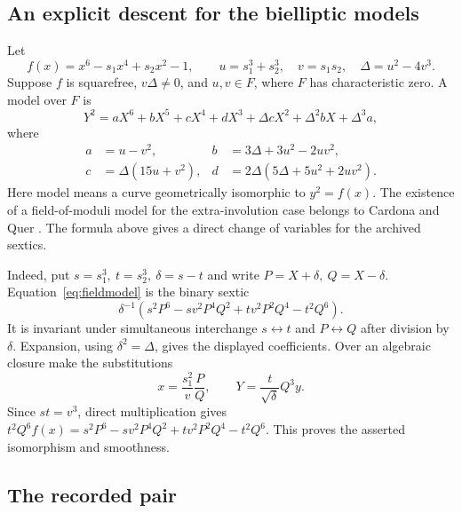 \documentclass[11pt,letterpaper]{amsart}
\theoremstyle{definition}
\numberwithin{equation}{section}
\begin{document}
\subsection{An explicit descent for the bielliptic models}

Let
\[
 f(x)=x^6-s_1x^4+s_2x^2-1,\qquad
 u=s_1^3+s_2^3,\quad v=s_1s_2,\quad \Delta=u^2-4v^3.
\]
Suppose \(f\) is squarefree, \(v\Delta\ne0\), and \(u,v\in F\), where
\(F\) has characteristic zero. A model over \(F\) is
\begin{equation}\label{eq:fieldmodel}
 Y^2=aX^6+bX^5+cX^4+dX^3+\Delta cX^2+\Delta^2 bX+\Delta^3a,
\end{equation}
where
\begin{align*}
 a&=u-v^2,& b&=3\Delta+3u^2-2uv^2,\\
 c&=\Delta(15u+v^2),& d&=2\Delta(5\Delta+5u^2+2uv^2).
\end{align*}
Here model means a curve geometrically isomorphic to \(y^2=f(x)\).
The existence of a field-of-moduli model for the extra-involution
case belongs to Cardona and Quer \cite{CardonaQuer}. The formula
above gives a direct change of variables for the archived sextics.

Indeed, put \(s=s_1^3,\ t=s_2^3,\ \delta=s-t\) and write
\(P=X+\delta,\ Q=X-\delta\). Equation~\eqref{eq:fieldmodel}
is the binary sextic
\[
 \delta^{-1}
 \left(s^2P^6-sv^2P^4Q^2+tv^2P^2Q^4-t^2Q^6\right).
\]
It is invariant under simultaneous interchange \(s\leftrightarrow t\)
and \(P\leftrightarrow Q\) after division by \(\delta\). Expansion,
using \(\delta^2=\Delta\), gives the displayed coefficients. Over
an algebraic closure make the substitutions
\[
 x=\frac{s_1^2}{v}\frac{P}{Q},\qquad
 Y=\frac{t}{\sqrt{\delta}}Q^3y.
\]
Since \(st=v^3\), direct multiplication gives
\(t^2Q^6f(x)=s^2P^6-sv^2P^4Q^2+tv^2P^2Q^4-t^2Q^6\).
This proves the asserted isomorphism and smoothness.

\subsection{The recorded pair}
\end{document}
